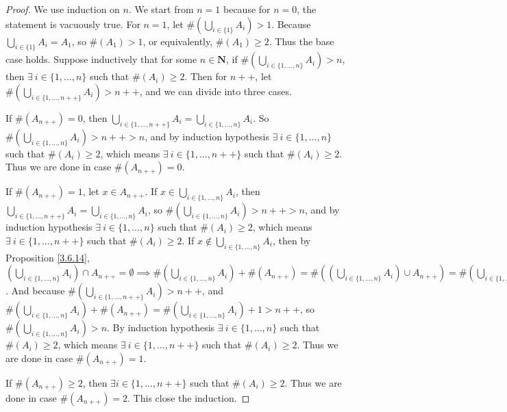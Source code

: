 \begin{proof}
    We use induction on \(n\).
    We start from \(n = 1\) because for \(n = 0\), the statement is vacuously true.
    For \(n = 1\), let \(\#(\bigcup_{i \in \{1\}} A_i) > 1\).
    Because \(\bigcup_{i \in \{1\}} A_i = A_1\), so \(\#(A_1) > 1\), or equivalently, \(\#(A_1) \geq 2\).
    Thus the base case holds.
    Suppose inductively that for some \(n \in \mathbf{N}\), if \(\#(\bigcup_{i \in \{1, \dots, n\}} A_i) > n\), then \(\exists\ i \in \{1, \dots, n\}\) such that \(\#(A_i) \geq 2\).
    Then for \(n++\), let \(\#(\bigcup_{i \in \{1, \dots, n++\}} A_i) > n++\), and we can divide into three cases.

    If \(\#(A_{n++}) = 0\), then \(\bigcup_{i \in \{1, \dots, n++\}} A_i = \bigcup_{i \in \{1, \dots, n\}} A_i\).
    So \(\#(\bigcup_{i \in \{1, \dots, n\}} A_i) > n++ > n\), and by induction hypothesis \(\exists\ i \in \{1, \dots, n\}\) such that \(\#(A_i) \geq 2\), which means \(\exists\ i \in \{1, \dots, n++\}\) such that \(\#(A_i) \geq 2\).
    Thus we are done in case \(\#(A_{n++}) = 0\).

    If \(\#(A_{n++}) = 1\), let \(x \in A_{n++}\).
    If \(x \in \bigcup_{i \in \{1, \dots, n\}} A_i\), then \(\bigcup_{i \in \{1, \dots, n++\}} A_i = \bigcup_{i \in \{1, \dots, n\}} A_i\), so \(\#(\bigcup_{i \in \{1, \dots, n\}} A_i) > n++ > n\), and by induction hypothesis \(\exists\ i \in \{1, \dots, n\}\) such that \(\#(A_i) \geq 2\), which means \(\exists\ i \in \{1, \dots, n++\}\) such that \(\#(A_i) \geq 2\).
    If \(x \notin \bigcup_{i \in \{1, \dots, n\}} A_i\), then by Proposition \ref{3.6.14}, \((\bigcup_{i \in \{1, \dots, n\}} A_i) \cap A_{n++} = \emptyset \implies \#(\bigcup_{i \in \{1, \dots, n\}} A_i) + \#(A_{n++}) = \#((\bigcup_{i \in \{1, \dots, n\}} A_i) \cup A_{n++}) = \#(\bigcup_{i \in \{1, \dots, n++\}} A_i)\).
    And because \(\#(\bigcup_{i \in \{1, \dots, n++\}} A_i) > n++\), and \(\#(\bigcup_{i \in \{1, \dots, n\}} A_i) + \#(A_{n++}) = \#(\bigcup_{i \in \{1, \dots, n\}} A_i) + 1 > n++\), so \(\#(\bigcup_{i \in \{1, \dots, n\}} A_i) > n\).
    By induction hypothesis \(\exists\ i \in \{1, \dots, n\}\) such that \(\#(A_i) \geq 2\), which means \(\exists\ i \in \{1, \dots, n++\}\) such that \(\#(A_i) \geq 2\).
    Thus we are done in case \(\#(A_{n++}) = 1\).

    If \(\#(A_{n++}) \geq 2\), then \(\exists i \in \{1, \dots, n++\}\) such that \(\#(A_i) \geq 2\).
    Thus we are done in case \(\#(A_{n++}) = 2\).
    This close the induction.
\end{proof}